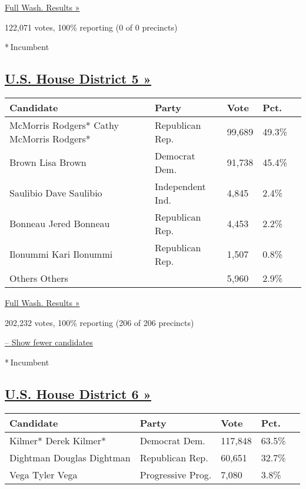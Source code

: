 \href{https://www.nytimes3xbfgragh.onion/elections/results/washington}{Full
Wash. Results »}

122,071 votes, 100\% reporting (0 of 0 precincts)

* Incumbent

\hypertarget{us-house-district-5-}{%
\subsection{\texorpdfstring{\href{https://www.nytimes3xbfgragh.onion/elections/results/washington-house-district-5-primary-election}{U.S.
House District 5
»}}{U.S. House District 5 »}}\label{us-house-district-5-}}

\begin{longtable}[]{@{}lllll@{}}
\toprule
Candidate & Party & Vote & Pct. &\tabularnewline
\midrule
\endhead
 McMorris Rodgers* Cathy McMorris Rodgers* & Republican Rep. & 99,689 &
49.3\% &\tabularnewline
 Brown Lisa Brown & Democrat Dem. & 91,738 & 45.4\% &\tabularnewline
 Saulibio Dave Saulibio & Independent Ind. & 4,845 & 2.4\%
&\tabularnewline
 Bonneau Jered Bonneau & Republican Rep. & 4,453 & 2.2\%
&\tabularnewline
 Ilonummi Kari Ilonummi & Republican Rep. & 1,507 & 0.8\%
&\tabularnewline
 Others Others & & 5,960 & 2.9\% &\tabularnewline
\bottomrule
\end{longtable}

\href{https://www.nytimes3xbfgragh.onion/elections/results/washington}{Full
Wash. Results »}

202,232 votes, 100\% reporting (206 of 206 precincts)

\protect\hyperlink{}{-- Show fewer candidates}

* Incumbent

\hypertarget{us-house-district-6-}{%
\subsection{\texorpdfstring{\href{https://www.nytimes3xbfgragh.onion/elections/results/washington-house-district-6-primary-election}{U.S.
House District 6
»}}{U.S. House District 6 »}}\label{us-house-district-6-}}

\begin{longtable}[]{@{}lllll@{}}
\toprule
Candidate & Party & Vote & Pct. &\tabularnewline
\midrule
\endhead
 Kilmer* Derek Kilmer* & Democrat Dem. & 117,848 & 63.5\%
&\tabularnewline
 Dightman Douglas Dightman & Republican Rep. & 60,651 & 32.7\%
&\tabularnewline
 Vega Tyler Vega & Progressive Prog. & 7,080 & 3.8\% &\tabularnewline
\bottomrule
\end{longtable}

